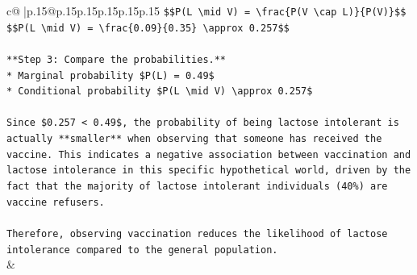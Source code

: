 \documentclass{article}
\begin{document}
{\begin{supertabular}{c@{$\;$}|p{.15\linewidth}@{}p{.15\linewidth}p{.15\linewidth}p{.15\linewidth}p{.15\linewidth}p{.15\linewidth}}
{{{\texttt{\$\$P(L \textbackslash{}mid V) = \textbackslash{}frac\{P(V \textbackslash{}cap L)\}\{P(V)\}\$\$} \\
\texttt{\$\$P(L \textbackslash{}mid V) = \textbackslash{}frac\{0.09\}\{0.35\} \textbackslash{}approx 0.257\$\$} \\
\\ 
\texttt{**Step 3: Compare the probabilities.**} \\
\texttt{*   Marginal probability \$P(L) = 0.49\$} \\
\texttt{*   Conditional probability \$P(L \textbackslash{}mid V) \textbackslash{}approx 0.257\$} \\
\\ 
\texttt{Since \$0.257 < 0.49\$, the probability of being lactose intolerant is actually **smaller** when observing that someone has received the vaccine. This indicates a negative association between vaccination and lactose intolerance in this specific hypothetical world, driven by the fact that the majority of lactose intolerant individuals (40\%) are vaccine refusers.} \\
\\ 
\texttt{Therefore, observing vaccination reduces the likelihood of lactose intolerance compared to the general population.} \\
            }
        }
    }
    & \\ \\


\end{supertabular}}
\end{document}
